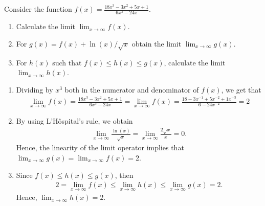 \documentclass[11.0pt]{exam}
\begin{document}
\begin{questions}

\question[3]
    Consider the function $f(x) = \frac{18x^3 - 3x^2 + 5x + 1}{6x^3 - 24x}$.
    \begin{enumerate}[leftmargin = 0.5cm, label = (\alph*), rightmargin = 0.2cm]
        \item Calculate the limit $\lim_{x\rightarrow\infty} f(x)$.
        \item For $g(x) = f(x) + \ln(x)/\sqrt{x}$ obtain the limit $\lim_{x\rightarrow\infty} g(x)$.
        \item For $h(x)$ such that $f(x) \leq h(x) \leq g(x)$, calculate the limit $\lim_{x\rightarrow\infty} h(x)$.
    \end{enumerate}
\begin{solution}[0cm]
    \begin{enumerate}[leftmargin = 0.5cm, label = (\alph*), rightmargin = 0.2cm]
        \item Dividing by $x^3$ both in the numerator and denominator of $f(x)$, we get that
        \begin{align*}
            \lim_{x\rightarrow\infty} f(x) = \frac{18x^3 - 3x^2 + 5x + 1}{6x^3 - 24x} = \lim_{x\rightarrow\infty} f(x) = \frac{18 - 3x^{-1} + 5x^{-2} + 1x^{-3}}{6 - 24x^{-2}} = 2
        \end{align*}
        \item By using L'Hôspital's rule, we obtain 
        \begin{align*}
            \lim_{x\rightarrow\infty} \frac{\ln(x)}{\sqrt{x}} = \lim_{x\rightarrow\infty} \frac{2\sqrt{x}}{x} = 0.
        \end{align*}
        Hence, the linearity of the limit operator implies that $\lim_{x\rightarrow\infty} g(x) = \lim_{x\rightarrow\infty}f(x) = 2$.
        \item Since $f(x) \leq h(x) \leq g(x)$, then 
        \begin{align*}
            2 = \lim_{x\rightarrow\infty}f(x) \leq \lim_{x\rightarrow\infty}h(x) \leq \lim_{x\rightarrow\infty}g(x) = 2.
        \end{align*}
        Hence, $\lim_{x\rightarrow\infty}h(x) = 2$.
    \end{enumerate}
\end{solution}


\end{questions}
\end{document}

